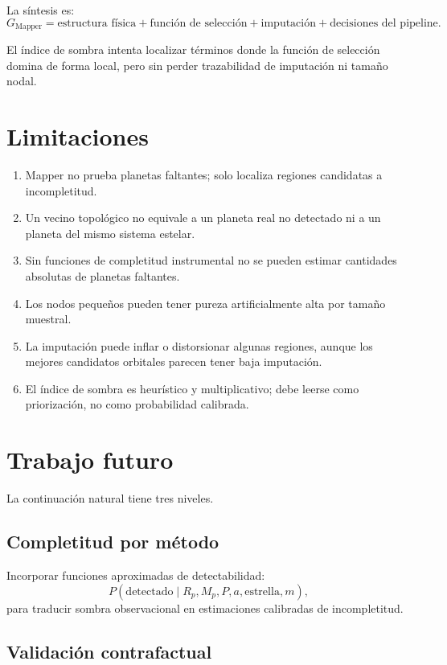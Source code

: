 \documentclass[11pt]{article}
\begin{document}
La síntesis es:
\[
G_{\mathrm{Mapper}} = \text{estructura física} + \text{función de selección} + \text{imputación} + \text{decisiones del pipeline}.
\]

El índice de sombra intenta localizar términos donde la función de selección domina de forma local, pero sin perder trazabilidad de imputación ni tamaño nodal.

\section{Limitaciones}

\begin{enumerate}
  \item Mapper no prueba planetas faltantes; solo localiza regiones candidatas a incompletitud.
  \item Un vecino topológico no equivale a un planeta real no detectado ni a un planeta del mismo sistema estelar.
  \item Sin funciones de completitud instrumental no se pueden estimar cantidades absolutas de planetas faltantes.
  \item Los nodos pequeños pueden tener pureza artificialmente alta por tamaño muestral.
  \item La imputación puede inflar o distorsionar algunas regiones, aunque los mejores candidatos orbitales parecen tener baja imputación.
  \item El índice de sombra es heurístico y multiplicativo; debe leerse como priorización, no como probabilidad calibrada.
\end{enumerate}

\section{Trabajo futuro}

La continuación natural tiene tres niveles.

\subsection{Completitud por método}

Incorporar funciones aproximadas de detectabilidad:
\[
P(\mathrm{detectado}\mid R_p,M_p,P,a,\mathrm{estrella},m),
\]
para traducir sombra observacional en estimaciones calibradas de incompletitud.

\subsection{Validación contrafactual}
\end{document}

